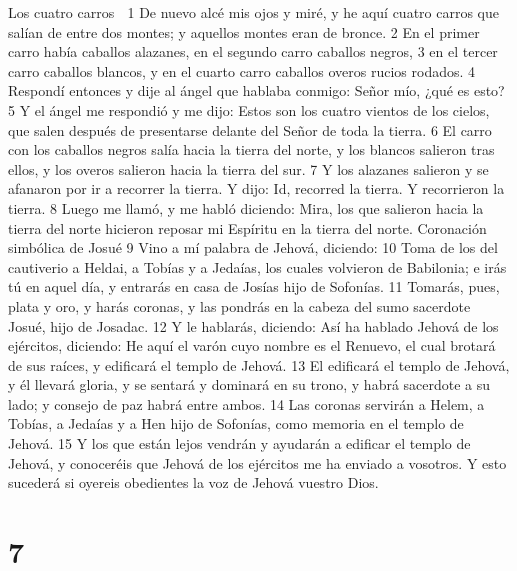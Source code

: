 Los cuatro carros

1 De nuevo alcé mis ojos y miré, y he aquí cuatro carros que salían de entre dos montes; y aquellos montes eran de bronce.
2 En el primer carro había caballos alazanes, en el segundo carro caballos negros, 
3 en el tercer carro caballos blancos, y en el cuarto carro caballos overos rucios rodados.
4 Respondí entonces y dije al ángel que hablaba conmigo: Señor mío, ¿qué es esto?
5 Y el ángel me respondió y me dijo: Estos son los cuatro vientos de los cielos, que salen después de presentarse delante del Señor de toda la tierra.
6 El carro con los caballos negros salía hacia la tierra del norte, y los blancos salieron tras ellos, y los overos salieron hacia la tierra del sur.
7 Y los alazanes salieron y se afanaron por ir a recorrer la tierra. Y dijo: Id, recorred la tierra. Y recorrieron la tierra.
8 Luego me llamó, y me habló diciendo: Mira, los que salieron hacia la tierra del norte hicieron reposar mi Espíritu en la tierra del norte.
Coronación simbólica de Josué
9 Vino a mí palabra de Jehová, diciendo:
10 Toma de los del cautiverio a Heldai, a Tobías y a Jedaías, los cuales volvieron de Babilonia; e irás tú en aquel día, y entrarás en casa de Josías hijo de Sofonías.
11 Tomarás, pues, plata y oro, y harás coronas, y las pondrás en la cabeza del sumo sacerdote Josué, hijo de Josadac.
12 Y le hablarás, diciendo: Así ha hablado Jehová de los ejércitos, diciendo: He aquí el varón cuyo nombre es el Renuevo, el cual brotará de sus raíces, y edificará el templo de Jehová.
13 El edificará el templo de Jehová, y él llevará gloria, y se sentará y dominará en su trono, y habrá sacerdote a su lado; y consejo de paz habrá entre ambos.
14 Las coronas servirán a Helem, a Tobías, a Jedaías y a Hen hijo de Sofonías, como memoria en el templo de Jehová.
15 Y los que están lejos vendrán y ayudarán a edificar el templo de Jehová, y conoceréis que Jehová de los ejércitos me ha enviado a vosotros. Y esto sucederá si oyereis obedientes la voz de Jehová vuestro Dios.

\chapter{7}

